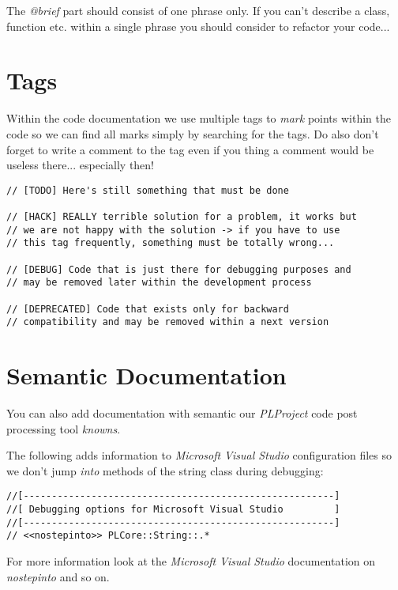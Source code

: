 The \emph{@brief} part should consist of one phrase only. If you can't describe a class, function etc. within a single phrase you should consider to refactor your code...




\section{Tags}
Within the code documentation we use multiple tags to \emph{mark} points within the code so we can find all marks simply by searching for the tags. Do also don't forget to write a comment to the tag even if you thing a comment would be useless there... especially then!

\begin{lstlisting}[caption=Comment tags]
// [TODO] Here's still something that must be done

// [HACK] REALLY terrible solution for a problem, it works but
// we are not happy with the solution -> if you have to use
// this tag frequently, something must be totally wrong...

// [DEBUG] Code that is just there for debugging purposes and
// may be removed later within the development process

// [DEPRECATED] Code that exists only for backward
// compatibility and may be removed within a next version
\end{lstlisting}




\section{Semantic Documentation}
You can also add documentation with semantic our \emph{PLProject} code post processing tool \emph{knowns}.

The following adds information to \emph{Microsoft Visual Studio} configuration files so we don't jump \emph{into} methods of the string class during debugging:

\begin{lstlisting}[caption=Semantic documentation]
//[-------------------------------------------------------]
//[ Debugging options for Microsoft Visual Studio         ]
//[-------------------------------------------------------]
// <<nostepinto>> PLCore::String::.*
\end{lstlisting}

For more information look at the \emph{Microsoft Visual Studio} documentation on \emph{nostepinto} and so on.
